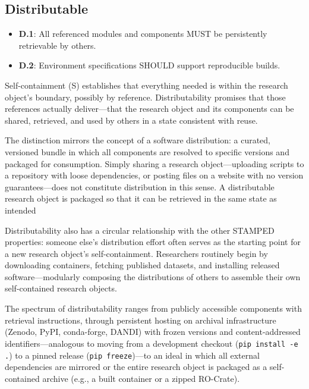 \documentclass{article}
\begin{document}
\subsection{Distributable}

\begin{itemize}
    \item \textbf{D.1}: All referenced modules and components MUST be persistently retrievable by others.
    \item \textbf{D.2}: Environment specifications SHOULD support reproducible builds.
\end{itemize}

Self-containment (S) establishes that everything needed is within the research object's boundary, possibly by reference.
Distributability promises that those references actually deliver---that the research object and its components can be shared, retrieved, and used by others in a state consistent with reuse.

The distinction mirrors the concept of a software distribution: a curated, versioned bundle in which all components are resolved to specific versions and packaged for consumption.
Simply sharing a research object---uploading scripts to a repository with loose dependencies, or posting files on a website with no version guarantees---does not constitute distribution in this sense.
A distributable research object is packaged so that it can be retrieved in the same state as intended

Distributability also has a circular relationship with the other STAMPED properties: someone else's distribution effort often serves as the starting point for a new research object's self-containment.
Researchers routinely begin by downloading containers, fetching published datasets, and installing released software---modularly composing the distributions of others to assemble their own self-contained research objects.

The spectrum of distributability ranges from publicly accessible components with retrieval instructions, through persistent hosting on archival infrastructure (Zenodo, PyPI, conda-forge, DANDI) with frozen versions and content-addressed identifiers---analogous to moving from a development checkout (\texttt{pip install -e .}) to a pinned release (\texttt{pip freeze})---to an ideal in which all external dependencies are mirrored or the entire research object is packaged as a self-contained archive (e.g., a built container or a zipped RO-Crate).
\end{document}
